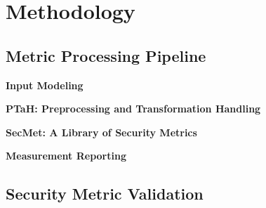 \section{Methodology}\label{sec_methodology}

% 

\subsection{Metric Processing Pipeline} \label{sec:methodology:input_modeling}

\textbf{Input Modeling}


\textbf{PTaH: Preprocessing and Transformation Handling}
\label{sec:methodology:ptah_arch}


\textbf{SecMet: A Library of Security Metrics}



\textbf{Measurement Reporting}



% 

\subsection{Security Metric Validation}\label{sec:methodology:validation}

